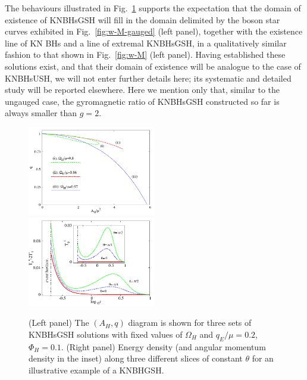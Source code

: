 \documentclass{article}
\begin{document}
The behaviours illustrated in Fig.~\ref{fig:q-AH-gauged} supports the expectation that the domain of existence of KNBHsGSH will fill in the domain delimited by the boson star curves exhibited in Fig.~\ref{fig:w-M-gauged} (left panel), together with the existence line of KN BHs and a line of extremal KNBHsGSH,  in a qualitatively similar fashion to that shown in Fig.~\ref{fig:w-M} (left panel). Having established these solutions exist, and that their domain of existence will be analogue to the case of KNBHsUSH, we will not enter further details here; its systematic and detailed study will be reported elsewhere.
Here we mention only that, similar to the ungauged case, 
the gyromagnetic ratio of  KNBHsGSH constructed so far is always smaller than $g=2$.


\begin{figure}[H]
  \begin{center}
    \includegraphics[width=0.497\textwidth]{BH-q-AH} 
      \includegraphics[width=0.497\textwidth]{energy-2d} 
  \end{center}
  \caption{ (Left panel) 
	The $(A_H,q)$ diagram is shown for three sets of KNBHsGSH solutions with fixed values of 
$\Omega_H$ and 
$q_E/\mu=0.2$, 
$\Phi_H=0.1$. (Right panel) 
 Energy density (and angular momentum density in the inset) along three different slices of constant $\theta$ for an illustrative example of a KNBHGSH.
	}
  \label{fig:q-AH-gauged}
\end{figure}
 
\end{document}
